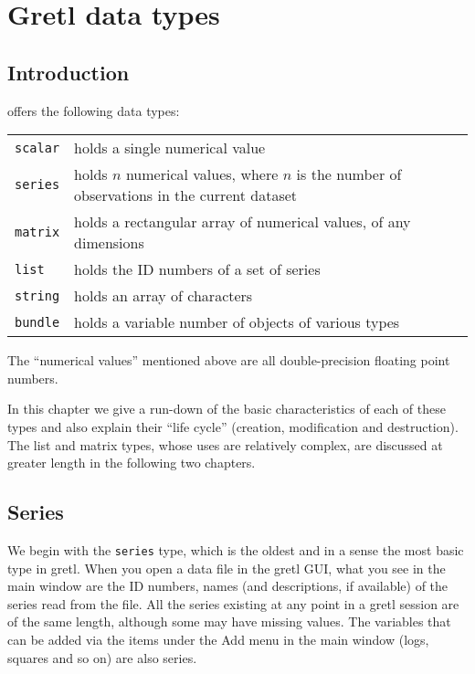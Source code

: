\chapter{Gretl data types}
\label{chap:datatypes}

\section{Introduction}

 offers the following data types:
%
\begin{center}
\begin{tabular}{lp{}}
\texttt{scalar} & holds a single numerical value\\
\texttt{series} & holds $n$ numerical values, where $n$
 is the number of observations in the current dataset \\
\texttt{matrix} & holds a rectangular array of numerical
 values, of any dimensions\\
\texttt{list} & holds the ID numbers of a set of series \\
\texttt{string} & holds an array of characters\\
\texttt{bundle} & holds a variable number of objects of 
 various types
\end{tabular}
\end{center}

The ``numerical values'' mentioned above are all double-precision
floating point numbers.

In this chapter we give a run-down of the basic characteristics of
each of these types and also explain their ``life cycle'' (creation,
modification and destruction). The list and matrix types, whose uses
are relatively complex, are discussed at greater length in the
following two chapters. 

\section{Series}
\label{sec:Series}

We begin with the \texttt{series} type, which is the oldest and in a
sense the most basic type in gretl. When you open a data file in the
gretl GUI, what you see in the main window are the ID numbers, names
(and descriptions, if available) of the series read from the file. All
the series existing at any point in a gretl session are of the same
length, although some may have missing values. The variables that can
be added via the items under the \textsf{Add} menu in the main window
(logs, squares and so on) are also series.

